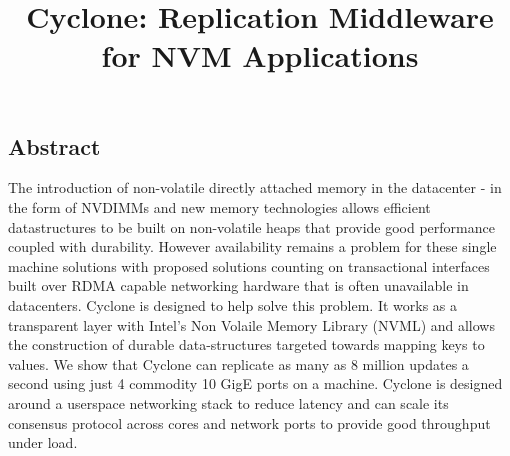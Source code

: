 \documentclass[letterpaper,twocolumn,10pt]{article}
\begin{document}
\date{}

\title{\Large \bf Cyclone: Replication Middleware for NVM Applications}


\maketitle


\subsection*{Abstract}
The introduction of non-volatile directly attached memory in the datacenter - in
the form of NVDIMMs and new memory technologies allows efficient datastructures
to be built on non-volatile heaps that provide good performance coupled with
durability. However availability remains a problem for these single machine
solutions with proposed solutions counting on transactional interfaces built
over RDMA capable networking hardware that is often unavailable in datacenters.
Cyclone is designed to help solve this problem. It works as a transparent layer
with Intel's Non Volaile Memory Library (NVML) and allows the construction of
durable data-structures targeted towards mapping keys to values. We show that
Cyclone can replicate as many as 8 million updates a second using just 4
commodity 10 GigE ports on a machine. Cyclone is designed around a userspace
networking stack to reduce latency and can scale its consensus protocol across
cores and network ports to provide good throughput under load.
\end{document}
